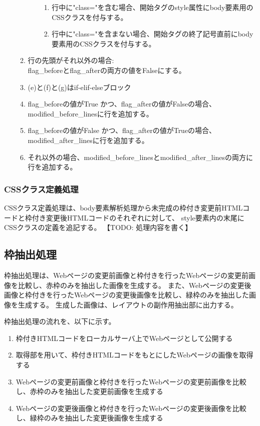 \begin{enumerate}
\begin{enumerate}
\begin{enumerate}
                              \begin{enumerate}
                                  \item 行中に"class="を含む場合、開始タグのstyle属性にbody要素用のCSSクラスを付与する。
                                  \item 行中に"class="を含まない場合、開始タグの終了記号直前にbody要素用のCSSクラスを付与する。
                              \end{enumerate}
                    \end{enumerate}
              \item 行の先頭がそれ以外の場合:\\
                    flag\_beforeとflag\_afterの両方の値をFalseにする。
              \item (e)と(f)と(g)はif-elif-elseブロック
              \item flag\_beforeの値がTrue かつ、flag\_afterの値がFalseの場合、modified\_before\_linesに行を追加する。
              \item flag\_beforeの値がFalse かつ、flag\_afterの値がTrueの場合、modified\_after\_linesに行を追加する。
              \item それ以外の場合、modified\_before\_linesとmodified\_after\_linesの両方に行を追加する。
          \end{enumerate}
\end{enumerate}

\subsubsection{CSSクラス定義処理}
CSSクラス定義処理は、body要素解析処理から未完成の枠付き変更前HTMLコードと枠付き変更後HTMLコードのそれぞれに対して、
style要素内の末尾にCSSクラスの定義を追記する。
【TODO: 処理内容を書く】

\subsection{枠抽出処理}\label{subsec:frame_extraction}
枠抽出処理は、Webページの変更前画像と枠付きを行ったWebページの変更前画像を比較し、赤枠のみを抽出した画像を生成する。
また、Webページの変更後画像と枠付きを行ったWebページの変更後画像を比較し、緑枠のみを抽出した画像を生成する。
生成した画像は、レイアウトの副作用抽出部に出力する。
\par
枠抽出処理の流れを、以下に示す。
\begin{enumerate}
    \item 枠付きHTMLコードをローカルサーバ上でWebページとして公開する
    \item 取得部を用いて、枠付きHTMLコードをもとにしたWebページの画像を取得する
    \item Webページの変更前画像と枠付きを行ったWebページの変更前画像を比較し、赤枠のみを抽出した変更前画像を生成する
    \item Webページの変更後画像と枠付きを行ったWebページの変更後画像を比較し、緑枠のみを抽出した変更後画像を生成する
\end{enumerate}


